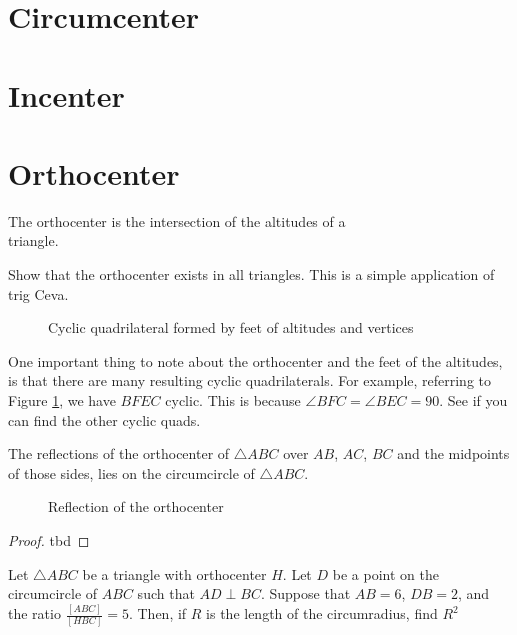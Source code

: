 \documentclass[11pt]{scrartcl}
\theoremstyle{plain}
\begin{document}
\section{Circumcenter}
\section{Incenter}
\section{Orthocenter}

    \begin{definition}
        The orthocenter is the intersection of the altitudes of a \\triangle.
   \end{definition} 

\begin{exercise}
    Show that the orthocenter exists in all triangles. This is a simple application of trig Ceva.
\end{exercise}


\begin{figure}[H]
    \centering
    \scalebox{.75}{}
    \caption{Cyclic quadrilateral formed by feet of altitudes and vertices}
    \label{fig:cyclic_orthocenter}
\end{figure}

One important thing to note about the orthocenter and the feet of the altitudes, is that there are many resulting cyclic quadrilaterals.
For example, referring to Figure \ref{fig:cyclic_orthocenter}, we have $BFEC$ cyclic. This is because $\angle BFC = \angle BEC = 90$.
See if you can find the other cyclic quads.\\
\begin{theorem}\label{reflecting_the_orthocenter}
    The reflections of the orthocenter of $\triangle ABC$ over $AB$, $AC$, $BC$ and the midpoints of those sides, lies on the circumcircle of $\triangle ABC$.
\end{theorem} 
\begin{figure}[H]
    \centering
    \scalebox{.75}{}
    \caption{Reflection of the orthocenter}
    \label{fig:reflection_orthocenter}
\end{figure}
\begin{proof}
    tbd
\end{proof}

\begin{example}[Pumac 2019]
    Let $\triangle ABC$ be a triangle with orthocenter $H$. Let $D$ be a point on the circumcircle
    of $ABC$ such that $AD \perp BC$. Suppose that $AB=6$, $DB=2$, and the ratio $\frac{[ABC]}{[HBC]}=5$. Then, if $R$
    is the length of the circumradius, find $R^2$
\end{example}
\end{document}
